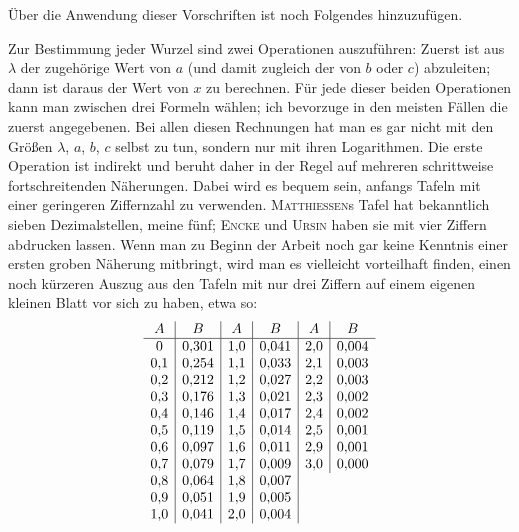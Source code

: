 Über die Anwendung dieser Vorschriften ist noch Folgendes hinzuzufügen.

Zur Bestimmung jeder Wurzel sind zwei Operationen auszuführen: Zuerst ist aus $\lambda$ der zugehörige Wert von $a$ (und damit zugleich der von $b$ oder $c$) abzuleiten; dann ist daraus der Wert von $x$ zu berechnen. Für jede dieser beiden Operationen kann man zwischen drei Formeln wählen; ich bevorzuge in den meisten Fällen die zuerst angegebenen. Bei allen diesen Rechnungen hat man es gar nicht mit den Größen $\lambda$, $a$, $b$, $c$ selbst zu tun, sondern nur mit ihren Logarithmen. Die erste Operation ist indirekt und beruht daher in der Regel auf mehreren schrittweise fortschreitenden Näherungen. Dabei wird es bequem sein, anfangs Tafeln mit einer geringeren Ziffernzahl zu verwenden. \textsc{Matthiessen}s Tafel hat bekanntlich sieben Dezimalstellen, meine fünf; \textsc{Encke} und \textsc{Ursin} haben sie mit vier Ziffern abdrucken lassen. Wenn man zu Beginn der Arbeit noch gar keine Kenntnis einer ersten groben Näherung mitbringt, wird man es vielleicht vorteilhaft finden, einen noch kürzeren Auszug aus den Tafeln mit nur drei Ziffern auf einem eigenen kleinen Blatt vor sich zu haben, etwa so:
\[
\begin{array}[t]{c|c|}
A&B\\\hline
0&0{,}301\\
0{,}1&0{,}254\\
0{,}2&0{,}212\\
0{,}3&0{,}176\\
0{,}4&0{,}146\\
0{,}5&0{,}119\\
0{,}6&0{,}097\\
0{,}7&0{,}079\\
0{,}8&0{,}064\\
0{,}9&0{,}051\\
1{,}0&0{,}041
\end{array}
\begin{array}[t]{c|c|}
A&B\\\hline
1{,}0&0{,}041\\
1{,}1&0{,}033\\
1{,}2&0{,}027\\
1{,}3&0{,}021\\
1{,}4&0{,}017\\
1{,}5&0{,}014\\
1{,}6&0{,}011\\
1{,}7&0{,}009\\
1{,}8&0{,}007\\
1{,}9&0{,}005\\
2{,}0&0{,}004
\end{array}
\begin{array}[t]{c|c}
A&B\\\hline
2{,}0&0{,}004\\
2{,}1&0{,}003\\
2{,}2&0{,}003\\
2{,}3&0{,}002\\
2{,}4&0{,}002\\
2{,}5&0{,}001\\
2{,}9&0{,}001\\
3{,}0&0{,}000
\end{array}
\]

